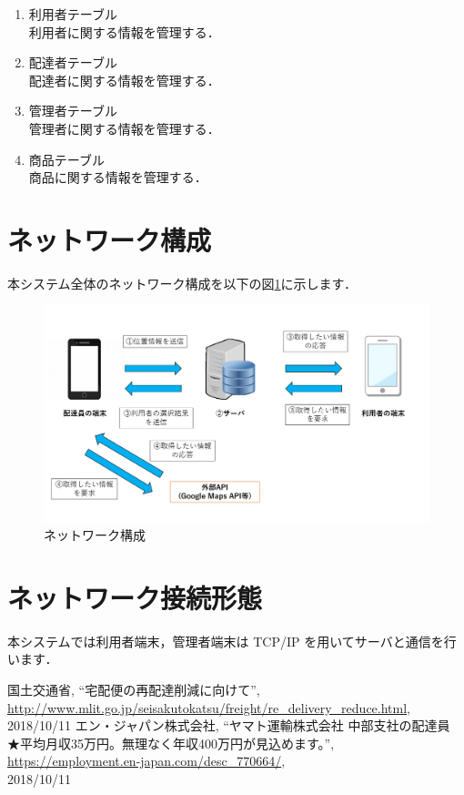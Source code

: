 \documentclass[a4j,titlepage]{jarticle}
\begin{document}
\begin{enumerate}
\item 利用者テーブル\\
  利用者に関する情報を管理する．
\item 配達者テーブル\\
  配達者に関する情報を管理する．
\item 管理者テーブル\\
  管理者に関する情報を管理する．
\item 商品テーブル\\
  商品に関する情報を管理する．
\end{enumerate}

\section{ネットワーク構成}
本システム全体のネットワーク構成を以下の図\ref{fig:i_f}に示します．

\begin{figure}[H]
 \begin{center}
  \includegraphics[width=140mm]{information_flow.png}
	\caption{ネットワーク構成}
	\label{fig:i_f}
 \end{center}

\end{figure}


\section{ネットワーク接続形態}
本システムでは利用者端末，管理者端末は TCP/IP を用いてサーバと通信を行います．




\begin{thebibliography}{9}

国土交通省,
\newblock ``宅配便の再配達削減に向けて'',\\
\newblock \url{http://www.mlit.go.jp/seisakutokatsu/freight/re_delivery_reduce.html}, \\
2018/10/11
エン・ジャパン株式会社,
\newblock ``ヤマト運輸株式会社 中部支社の配達員　★平均月収35万円。無理なく年収400万円が見込めます。'',\\
\newblock \url{https://employment.en-japan.com/desc_770664/}, \\
2018/10/11
\end{thebibliography}
\end{document}
